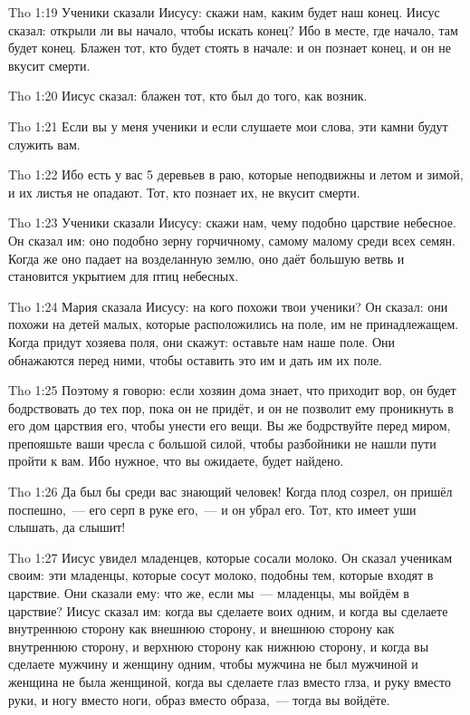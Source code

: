 \vs Tho 1:19
Ученики сказали Иисусу:
скажи нам, каким будет наш конец.
Иисус сказал: открыли ли вы начало, чтобы искать конец?
Ибо в месте, где начало, там будет конец.
Блажен тот, кто будет стоять в начале:
и он познает конец, и он не вкусит смерти.

\vs Tho 1:20
Иисус сказал: блажен тот, кто был до того, как возник.

\vs Tho 1:21
Если вы у меня ученики и если слушаете мои слова,
эти камни будут служить вам.

\vs Tho 1:22
Ибо есть у вас 5 деревьев в раю,
которые неподвижны и летом и зимой,
и их листья не опадают.
Тот, кто познает их, не вкусит смерти.

\vs Tho 1:23
Ученики сказали Иисусу:
скажи нам, чему подобно царствие небесное.
Он сказал им: оно подобно зерну горчичному,
самому малому среди всех семян.
Когда же оно падает на возделанную землю,
оно даёт большую ветвь и становится укрытием для птиц небесных.

\vs Tho 1:24
Мария сказала Иисусу:
на кого похожи твои ученики?
Он сказал: они похожи на детей малых,
которые расположились на поле, им не принадлежащем.
Когда придут хозяева поля, они скажут: оставьте нам наше поле.
Они обнажаются перед ними, чтобы оставить это им и дать им их поле.

\vs Tho 1:25
Поэтому я говорю:
если хозяин дома знает, что приходит вор,
он будет бодрствовать до тех пор, пока он не придёт,
и он не позволит ему проникнуть в его дом царствия его,
чтобы унести его вещи.
Вы же бодрствуйте перед миром, препояшьте ваши чресла
с большой силой, чтобы разбойники не нашли пути пройти к вам.
Ибо нужное, что вы ожидаете, будет найдено.

\vs Tho 1:26
Да был бы среди вас знающий человек!
Когда плод созрел, он пришёл поспешно,~--- его
серп в руке его,~--- и он убрал его.
Тот, кто имеет уши слышать, да слышит!

\vs Tho 1:27
Иисус увидел младенцев, которые сосали молоко.
Он сказал ученикам своим:
эти младенцы, которые сосут молоко, подобны тем,
которые входят в царствие.
Они сказали ему:
что же, если мы~--- младенцы, мы войдём в царствие?
Иисус сказал им: когда вы сделаете воих одним,
и когда вы сделаете внутреннюю сторону как внешнюю сторону,
и внешнюю сторону как внутреннюю сторону,
и верхнюю сторону как нижнюю сторону,
и когда вы сделаете мужчину и женщину одним,
чтобы мужчина не был мужчиной и женщина не была женщиной,
когда вы сделаете глаз вместо глза,
и руку вместо руки,
и ногу вместо ноги,
образ вместо образа,~--- тогда вы войдёте.

